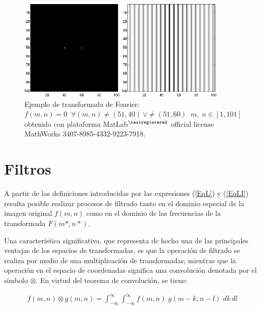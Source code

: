 \begin{center}
\begin{figure} [!h]

\centering
\includegraphics[width=10cm]{figures/Fig2_5.png}

\caption{Ejemplo de transformada de Fourier: $f(m, n) = 0 \; \; \forall (m, n) \neq (51, 40) \, \vee \neq (51, 60) \; \;  m, \; n \in [1, 101]$
         obtenido con plataforma MatLab$^{\textregistered}$ official license MathWorks 3407-8985-4332-9223-7918.}
\label{Fig2_5}

\end{figure}
\end{center}



\section{Filtros}


A partir de las definiciones introducidas por las expresiones (\ref{EqL}) y (\ref{EqLI}) resulta posible realizar procesos de filtrado tanto en el dominio
especial de la imagen original $f(m, n)$ como en el dominio de las frecuencias de la transformada $F(m*, n*)$.
%

%
Una caracter\'istica significativa, que representa de hecho una de las principales ventajas de los espacios de transformadas, es que la operaci\'on de
filtrado se realiza por medio de una multiplicaci\'on de transformadas; mientras que la operaci\'on en el espacio de coordenadas significa una convoluci\'on
denotada por el s\'imbolo $\otimes$. En virtud del teorema de convoluci\'on, se tiene:

\begin{eqnarray}
	f(m, n) \otimes g(m, n) = \int_{-\infty}^{\infty} \int_{-\infty}^{\infty} f(m, n) \; g(m-k, n-l)\; dk \, dl
\label{EqLII}
\end{eqnarray}

